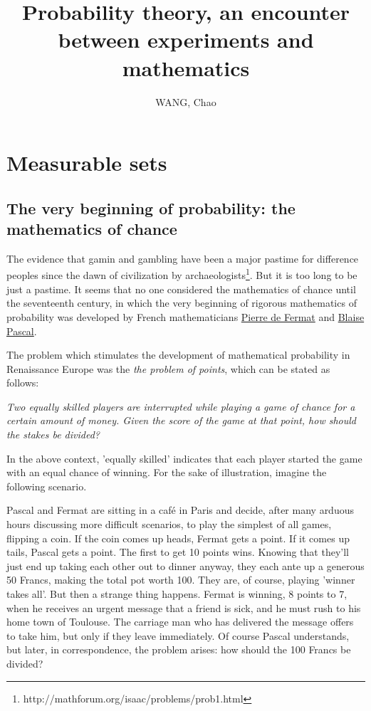 \documentclass[10pt,a4paper]{book}
\title{Probability theory, an encounter between experiments and mathematics}
\author{WANG, Chao}
\begin{document}
\maketitle
\tableofcontents

\chapter{Measurable sets}
\section{The very beginning of probability: the mathematics of chance}
The evidence that gamin and gambling have been a major pastime for difference peoples since the dawn of civilization by archaeologists\footnote{http://mathforum.org/isaac/problems/prob1.html}. But it is too long to be just a pastime. It seems that no one considered the mathematics of chance until the seventeenth century, in which the very beginning of rigorous mathematics of probability was developed by French mathematicians \href{http://en.wikipedia.org/wiki/Pierre_de_Fermat}{Pierre de Fermat} and \href{http://en.wikipedia.org/wiki/Blaise_pascal}{Blaise Pascal}.

The problem which stimulates the development of mathematical probability in Renaissance Europe was the \textit{the problem of points}, which can be stated as follows:

\textit{Two equally skilled players are interrupted while playing a game of chance for a certain amount of money. Given the score of the game at that point, how should the stakes be divided? }

In the above context, 'equally skilled' indicates that each player started the game with an equal chance of winning. For the sake of illustration, imagine the following scenario.

Pascal and Fermat are sitting in a caf\'e in Paris and decide, after many arduous hours discussing more difficult scenarios, to play the simplest of all games, flipping a coin. If the coin comes up heads, Fermat gets a point. If it comes up tails, Pascal gets a point. The first to get 10 points wins. Knowing that they'll just end up taking each other out to dinner anyway, they each ante up a generous 50 Francs, making the total pot worth 100. They are, of course, playing 'winner takes all'. But then a strange thing happens. Fermat is winning, 8 points to 7, when he receives an urgent message that a friend is sick, and he must rush to his home town of Toulouse. The carriage man who has delivered the message offers to take him, but only if they leave immediately. Of course Pascal understands, but later, in correspondence, the problem arises: how should the 100 Francs be divided?
\end{document}
